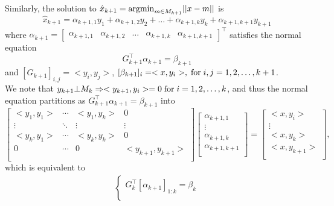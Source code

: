 \documentclass[letterpaper]{article}
\begin{document}
\begin{enumerate}
Similarly, the solution to $\hat{x}_{k+1}={\rm arg min}_{m\in M_{k+1}}||x-m||$ is
\begin{equation*}
  \hat{x}_{k+1} = \alpha_{k+1,1}y_{1}+\alpha_{k+1,2}y_{2}+\ldots+\alpha_{k+1,k}y_{k}+\alpha_{k+1,k+1}y_{k+1}
\end{equation*}
where $\alpha_{k+1} =\begin{bmatrix}\alpha_{k+1,1} & \alpha_{k+1,2} & \ldots &\alpha_{k+1,k}&\alpha_{k+1,k+1}\end{bmatrix}^{\top}$ satisfies the  normal equation
$$G_{k+1}^{\top}\alpha_{k+1}=\beta_{k+1}$$
and $[G_{k+1}]_{i,j}=<y_{i}, y_{j}>$, $[\beta_{k+1}]_{i}=<x, y_{i}>, \;{\rm for }\;i,j=1,2,\ldots, k+1$. \\

We note that $y_{k+1}\bot M_{k}\Rightarrow <y_{k+1}, y_{i}>=0\;{\rm for }\;i=1,2,\ldots, k$, and thus the normal equation partitions as $G_{k+1}^{\top}\alpha_{k+1}=\beta_{k+1}$ into
\begin{equation*}
  \left[
    \begin{array}{ccc|c}
      <y_{1}, y_{1}> & \cdots & <y_{1}, y_{k}> & 0 \\
      \vdots & \ddots & \vdots & \vdots \\
      <y_{k}, y_{1}> & \cdots & <y_{k}, y_{k}> & 0 \\\hline
      0 & \cdots & 0 & <y_{k+1}, y_{k+1}> \\
    \end{array}
  \right]
  \left[
    \begin{array}{c}
      \alpha_{k+1,1} \\  \vdots \\\alpha_{k+1,k}\\\hline \alpha_{k+1,k+1}\\
    \end{array}
  \right]
  =\left[
    \begin{array}{c}
      <x, y_{i}> \\  \vdots \\ <x, y_{k}>\\\hline <x, y_{k+1}>\\
    \end{array}
  \right],
\end{equation*}
which is equivalent to
\begin{equation*}
\begin{split}
    \left\{
      \begin{array}{c}
        G_{k}^{\top}[\alpha_{k+1}]_{1:k}=\beta_{k}\\

\end{array}
\end{split}
\end{equation*}
\end{enumerate}
\end{document}
